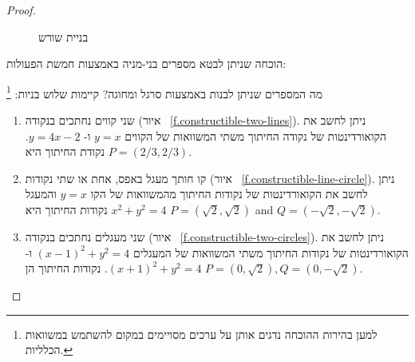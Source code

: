 \begin{proof}
\begin{figure}[htb]
\begin{center}
\end{center}
\caption{בניית שורש}
\label{f.trisect-square-root}
\end{figure}

\medskip

הוכחה שניתן לבטא מספרים בני-מניה באמצעות חמשת הפעולות:

מה המספרים שניתן לבנות באמצעות סרגל ומחוגה? קיימות שלוש בניות:%
\footnote{למען בהירות ההוכחה נדגים אותן על ערכים מסויימים במקום להשתמש במשוואות הכלליות.}
\begin{enumerate}
\item
שני קווים נחתכים בנקודה (איור%
~\ref{f.constructible-two-lines}).
ניתן לחשב את הקואורדינטות של נקודה החיתוך משתי המשוואות של הקווים
$y=x$
ו-%
$y=4x-2$.
נקודת החיתוך היא
$P= (2/3, 2/3)$.

\item
קו חותך מעגל באפס, אחת או שתי נקודות (איור%
~\ref{f.constructible-line-circle}).
ניתן לחשב את הקואורדינטות של נקודות החיתוך מהמשוואות של הקו 
$y=x$
והמעגל
$x^2+y^2=4$
נקודות החיתוך היא
$P=(\sqrt{2}, \sqrt{2})$ and $Q=(-\sqrt{2}, -\sqrt{2})$.

\item
שני מעגלים נחתכים בנקודה (איור%
~\ref{f.constructible-two-circles}).
ניתן לחשב את הקואורדינטות של נקודות החיתוך משתי המשוואות של המעגלים
$(x-1)^2+y^2=4$
ו-%
$(x+1)^2+y^2=4$.
נקודות החיתוך הן
$P=(0,\sqrt{2}),Q=(0,-\sqrt{2})$.
\end{enumerate}
\end{proof}


